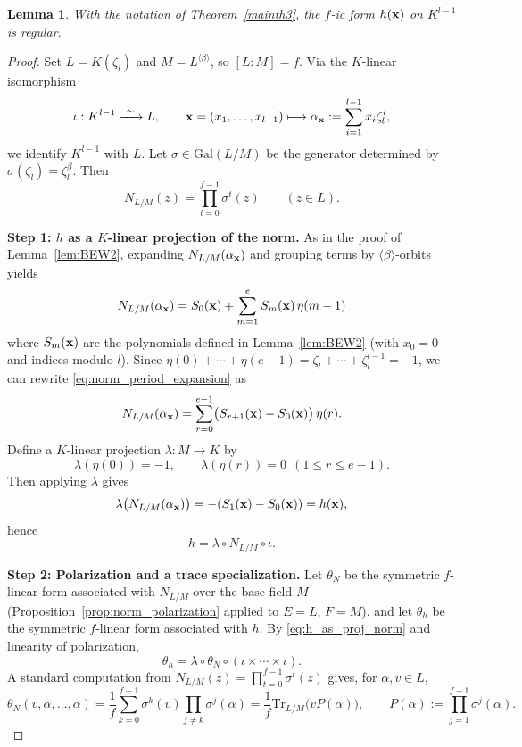 \documentclass[a4paper, 11pt]{amsart}
\newcommand{\Gal}{\mathrm{Gal}}
\newcommand{\Tr}{\mathrm{Tr}}
\theoremstyle{plain}
\newtheorem{lem}[thm]{Lemma}
\theoremstyle{definition}
\numberwithin{equation}{section}
\begin{document}
\begin{lem}\label{lem:h_regularity}
With the notation of Theorem~\ref{mainth3}, the $f$-ic form $h({\bf x})$ on $K^{l-1}$ is regular.
\end{lem}

\begin{proof}
Set $L=K(\zeta_l)$ and $M=L^{\langle\beta\rangle}$, so $[L:M]=f$.
Via the $K$-linear isomorphism
\[
\iota:K^{l-1}\xrightarrow{\ \sim\ }L,\qquad
{\bf x}=(x_1,\dots,x_{l-1})\longmapsto
\alpha_{\bf x}:=\sum_{i=1}^{l-1}x_i\zeta_l^i,
\]
we identify $K^{l-1}$ with $L$. Let $\sigma\in\Gal(L/M)$ be the generator determined by
$\sigma(\zeta_l)=\zeta_l^\beta$. Then
\[
N_{L/M}(z)=\prod_{t=0}^{f-1}\sigma^t(z)\qquad(z\in L).
\]

\medskip\noindent
\textbf{Step 1: $h$ as a $K$-linear projection of the norm.}
As in the proof of Lemma~\ref{lem:BEW2}, expanding $N_{L/M}(\alpha_{\bf x})$ and grouping terms by
$\langle\beta\rangle$-orbits yields
\begin{equation}\label{eq:norm_period_expansion}
N_{L/M}(\alpha_{\bf x})
= S_0({\bf x})+\sum_{m=1}^{e}S_m({\bf x})\,\eta(m-1)
\end{equation}
where $S_m({\bf x})$ are the polynomials defined in Lemma~\ref{lem:BEW2} (with $x_0=0$ and indices modulo $l$).
Since $\eta(0)+\cdots+\eta(e-1)=\zeta_l+\cdots+\zeta_l^{l-1}=-1$, we can rewrite \eqref{eq:norm_period_expansion} as
\[
N_{L/M}(\alpha_{\bf x})
=\sum_{r=0}^{e-1}\bigl(S_{r+1}({\bf x})-S_0({\bf x})\bigr)\,\eta(r).
\]
Define a $K$-linear projection $\lambda:M\to K$ by
\[
\lambda(\eta(0))=-1,\qquad \lambda(\eta(r))=0\ \ (1\le r\le e-1).
\]
Then applying $\lambda$ gives
\[
\lambda\bigl(N_{L/M}(\alpha_{\bf x})\bigr)=-(S_1({\bf x})-S_0({\bf x}))=h({\bf x}),
\]
hence
\begin{equation}\label{eq:h_as_proj_norm}
h=\lambda\circ N_{L/M}\circ\iota.
\end{equation}

\medskip\noindent
\textbf{Step 2: Polarization and a trace specialization.}
Let $\theta_N$ be the symmetric $f$-linear form associated with $N_{L/M}$ over the base field $M$
(Proposition~\ref{prop:norm_polarization} applied to $E=L$, $F=M$), and let $\theta_h$ be the symmetric
$f$-linear form associated with $h$.
By \eqref{eq:h_as_proj_norm} and linearity of polarization,
\begin{equation}\label{eq:theta_h_comp}
\theta_h=\lambda\circ\theta_N\circ(\iota\times\cdots\times\iota).
\end{equation}
A standard computation from $N_{L/M}(z)=\prod_{t=0}^{f-1}\sigma^t(z)$ gives, for $\alpha,v\in L$,
\begin{equation}\label{eq:thetaN_trace}
\theta_N(v,\alpha,\dots,\alpha)
=\frac{1}{f}\sum_{k=0}^{f-1}\sigma^k(v)\prod_{j\ne k}\sigma^j(\alpha)
=\frac{1}{f}\Tr_{L/M}\!\bigl(vP(\alpha)\bigr),
\qquad
P(\alpha):=\prod_{j=1}^{f-1}\sigma^j(\alpha).
\end{equation}


\end{proof}
\end{document}
